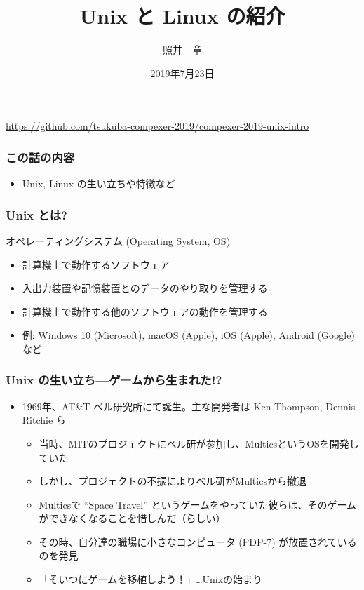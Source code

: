 \documentclass[dvipdfmx]{beamer}
\title{Unix と Linux の紹介}
\author{照井　章}
\institute{筑波大学 数理物質系}
\date{2019年7月23日}
\begin{document}
    
\begin{frame}
    \frametitle{}
    \titlepage

    \begin{center}
        \url{https://github.com/tsukuba-compexer-2019/compexer-2019-unix-intro}
    \end{center}
\end{frame}

\begin{frame}
    \frametitle{この話の内容}
    \large
    \begin{itemize}
        \item Unix, Linux の生い立ちや特徴など
    \end{itemize}
\end{frame}

\begin{frame}
    \frametitle{Unix とは? }

    \begin{block}{オペレーティングシステム (Operating System, OS)}
        \begin{itemize}
            \item 計算機上で動作するソフトウェア
            \item 入出力装置や記憶装置とのデータのやり取りを管理する
            \item 計算機上で動作する他のソフトウェアの動作を管理する
            \item 例: Windows 10 (Microsoft), macOS (Apple), iOS (Apple), Android (Google) など
        \end{itemize}
    \end{block}
\end{frame}

\begin{frame}
    \frametitle{Unix の生い立ち---ゲームから生まれた!? \cite{spacetravel}}
    \begin{itemize}
        \item<1-> 1969年、AT\&T ベル研究所にて誕生。主な開発者は Ken Thompson, Dennis Ritchie \cite{dmr} ら
        \begin{itemize}
            \item<2-> 当時、MITのプロジェクトにベル研が参加し、MulticsというOSを開発していた
            \item<3-> しかし、プロジェクトの不振によりベル研がMulticsから撤退
            \item<4-> Multicsで ``Space Travel'' というゲームをやっていた彼らは、そのゲームができなくなることを惜しんだ（らしい）
            \item<5-> その時、自分達の職場に小さなコンピュータ (PDP-7) が放置されているのを発見
            \item<6-> 「そいつにゲームを移植しよう！」\dots Unixの始まり
        \end{itemize}
    \end{itemize}
\end{frame}
\end{document}
